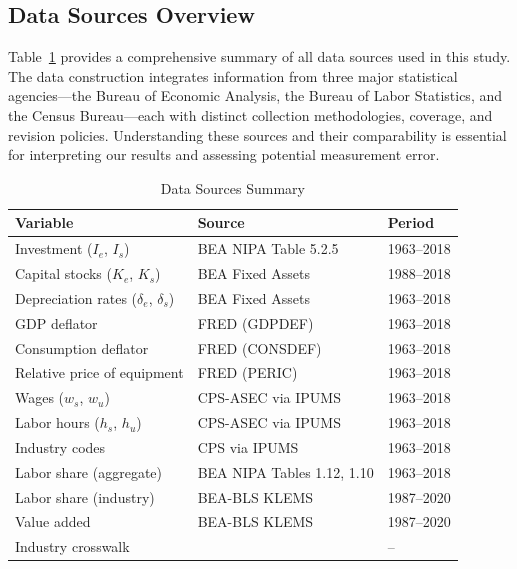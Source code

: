 \documentclass[12pt]{article}
\begin{document}
\subsection{Data Sources Overview}\label{subsec:data_sources}

Table~\ref{tab:data_sources} provides a comprehensive summary of all data sources used in this study. The data construction integrates information from three major statistical agencies---the Bureau of Economic Analysis, the Bureau of Labor Statistics, and the Census Bureau---each with distinct collection methodologies, coverage, and revision policies. Understanding these sources and their comparability is essential for interpreting our results and assessing potential measurement error.

\begin{table}[h]
\centering
\caption{Data Sources Summary}
\label{tab:data_sources}
\begin{tabular}{p{3.5cm}p{4.5cm}p{3cm}}
\hline\hline
\textbf{Variable} & \textbf{Source} & \textbf{Period} \\
\hline
Investment ($I_e$, $I_s$) & BEA NIPA Table 5.2.5 & 1963--2018 \\[0.5ex]
Capital stocks ($K_e$, $K_s$) & BEA Fixed Assets & 1988--2018 \\[0.5ex]
Depreciation rates ($\delta_e$, $\delta_s$) & BEA Fixed Assets & 1963--2018 \\[0.5ex]
GDP deflator & FRED (GDPDEF) & 1963--2018 \\[0.5ex]
Consumption deflator & FRED (CONSDEF) & 1963--2018 \\[0.5ex]
Relative price of equipment & FRED (PERIC) & 1963--2018 \\[0.5ex]
Wages ($w_s$, $w_u$) & CPS-ASEC via IPUMS & 1963--2018 \\[0.5ex]
Labor hours ($h_s$, $h_u$) & CPS-ASEC via IPUMS & 1963--2018 \\[0.5ex]
Industry codes & CPS via IPUMS & 1963--2018 \\[0.5ex]
Labor share (aggregate) & BEA NIPA Tables 1.12, 1.10 & 1963--2018 \\[0.5ex]
Labor share (industry) & BEA-BLS KLEMS & 1987--2020 \\[0.5ex]
Value added & BEA-BLS KLEMS & 1987--2020 \\[0.5ex]
Industry crosswalk & \citet{acemoglu2020unpacking} & -- \\[0.5ex]
\hline\hline
\end{tabular}


\end{table}
\end{document}
